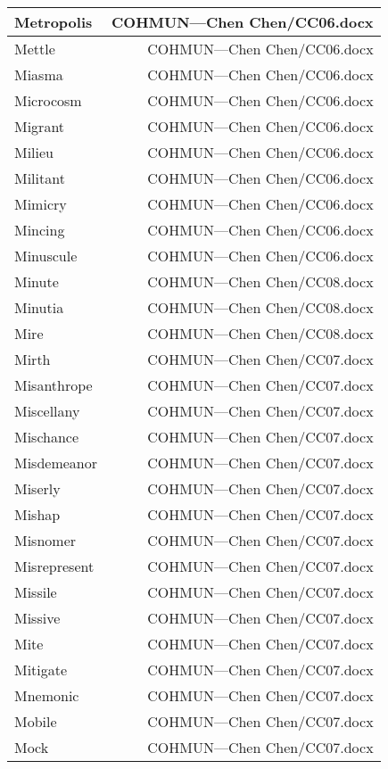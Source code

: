 \documentclass{article}
\begin{document}
\begin{center}
\begin{longtable}{|l|r|}
\hline
Metropolis  &  COHMUN---Chen Chen/CC06.docx\\  
\hline
Mettle  &  COHMUN---Chen Chen/CC06.docx\\  
\hline
Miasma  &  COHMUN---Chen Chen/CC06.docx\\  
\hline
Microcosm  &  COHMUN---Chen Chen/CC06.docx\\  
\hline
Migrant  &  COHMUN---Chen Chen/CC06.docx\\  
\hline
Milieu  &  COHMUN---Chen Chen/CC06.docx\\  
\hline
Militant  &  COHMUN---Chen Chen/CC06.docx\\  
\hline
Mimicry  &  COHMUN---Chen Chen/CC06.docx\\  
\hline
Mincing  &  COHMUN---Chen Chen/CC06.docx\\  
\hline
Minuscule  &  COHMUN---Chen Chen/CC06.docx\\  
\hline
Minute  &  COHMUN---Chen Chen/CC08.docx\\  
\hline
Minutia  &  COHMUN---Chen Chen/CC08.docx\\  
\hline
Mire  &  COHMUN---Chen Chen/CC08.docx\\  
\hline
Mirth  &  COHMUN---Chen Chen/CC07.docx\\  
\hline
Misanthrope  &  COHMUN---Chen Chen/CC07.docx\\  
\hline
Miscellany  &  COHMUN---Chen Chen/CC07.docx\\  
\hline
Mischance  &  COHMUN---Chen Chen/CC07.docx\\  
\hline
Misdemeanor  &  COHMUN---Chen Chen/CC07.docx\\  
\hline
Miserly  &  COHMUN---Chen Chen/CC07.docx\\  
\hline
Mishap  &  COHMUN---Chen Chen/CC07.docx\\  
\hline
Misnomer  &  COHMUN---Chen Chen/CC07.docx\\  
\hline
Misrepresent  &  COHMUN---Chen Chen/CC07.docx\\  
\hline
Missile  &  COHMUN---Chen Chen/CC07.docx\\  
\hline
Missive  &  COHMUN---Chen Chen/CC07.docx\\  
\hline
Mite  &  COHMUN---Chen Chen/CC07.docx\\  
\hline
Mitigate  &  COHMUN---Chen Chen/CC07.docx\\  
\hline
Mnemonic  &  COHMUN---Chen Chen/CC07.docx\\  
\hline
Mobile  &  COHMUN---Chen Chen/CC07.docx\\  
\hline
Mock  &  COHMUN---Chen Chen/CC07.docx\\  

\end{longtable}
\end{center}
\end{document}
